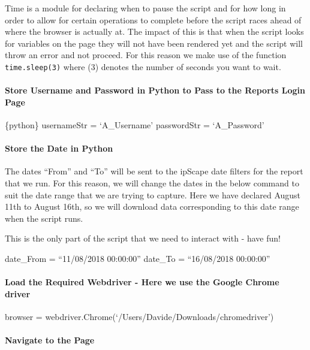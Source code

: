 \documentclass[]{article}
\let\oldparagraph\paragraph
\renewcommand{\paragraph}[1]{\oldparagraph{#1}\mbox{}}
\begin{document}
Time is a module for declaring when to pause the script and for how long
in order to allow for certain operations to complete before the script
races ahead of where the browser is actually at. The impact of this is
that when the script looks for variables on the page they will not have
been rendered yet and the script will throw an error and not proceed.
For this reason we make use of the function \texttt{time.sleep(3)} where
(3) denotes the number of seconds you want to wait.

\paragraph{Store Username and Password in Python to Pass to the Reports
Login
Page}\label{store-username-and-password-in-python-to-pass-to-the-reports-login-page}

\{python\} usernameStr = `A\_Username' passwordStr = `A\_Password'

\paragraph{Store the Date in Python}\label{store-the-date-in-python}

The dates ``From'' and ``To'' will be sent to the ipScape date filters
for the report that we run. For this reason, we will change the dates in
the below command to suit the date range that we are trying to capture.
Here we have declared August 11th to August 16th, so we will download
data corresponding to this date range when the script runs.

This is the only part of the script that we need to interact with - have
fun!

date\_From = ``11/08/2018 00:00:00'' date\_To = ``16/08/2018 00:00:00''

\paragraph{Load the Required Webdriver - Here we use the Google Chrome
driver}\label{load-the-required-webdriver---here-we-use-the-google-chrome-driver}

browser = webdriver.Chrome(`/Users/Davide/Downloads/chromedriver')

\paragraph{Navigate to the Page}\label{navigate-to-the-page}
\end{document}
